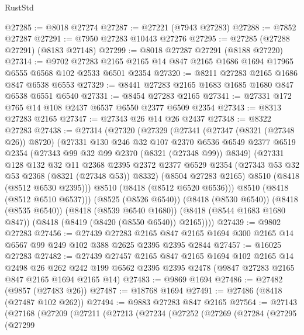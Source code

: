 \begin{lexlean}{RustStd}
\begin{coremodule}
@27285 := @8018 @27274
@27287 := @27221 (@7943 @27283)
@27288 := @7852 @27287
@27291 := @7950 @27283 @10443 @27276
@27295 := @27285 (@27288 @27291) (@8183 @27148)
@27299 := @8018 @27287 @27291 (@8188 @27220)
@27314 := @9702
    @27283
    @2165
    @2165
    @14
    @847
    @2165
    @1686
    @1694
    @17965
    @6555
    @6568
    @102
    @2533
    @6501
    @2354
@27320 := @8211 @27283 @2165 @1686 @847 @6538 @6553
@27329 := @8441 @27283 @2165 @1683 @1685 @1680 @847 @6538 @6551 @6540
@27331 := @8454 @27283 @2165
@27341 := @27331 @172 @765 @14 @108 @2437 @6537 @6550 @2377 @6509 @2354
@27343 := @8313 @27283 @2165
@27347 := @27343 @26 @14 @26 @2437
@27348 := @8322 @27283
@27438 := @27314
    (@27320
      (@27329
        (@27341
          (@27347 (@8321 (@27348 @26)) @8720)
          (@27331
            @130
            @246
            @32
            @107
            @2370
            @6536
            @6549
            @2377
            @6519
            @2354
            (@27343 @99 @32 @99 @2370 (@8321 (@27348 @99)) @8349)
            (@27331
              @128
              @132
              @32
              @11
              @2368
              @2395
              @2372
              @2377
              @6529
              @2354
              (@27343 @53 @32 @53 @2368 (@8321 (@27348 @53)) @8332)
              (@8504 @27283 @2165)
              @8510
              (@8418 (@8512 @6530 @2395)))
            @8510
            (@8418 (@8512 @6520 @6536)))
          @8510
          (@8418 (@8512 @6510 @6537)))
        (@8525 (@8526 @6540))
        (@8418 (@8530 @6540))
        (@8418 (@8535 @6540))
        (@8418 (@8539 @6540 @1680))
        (@8418 (@8544 @1683 @1680 @847))
        (@8418 (@8419 (@8420 (@8550 @6540)) @2165))))
@27439 := @9802 @27283
@27456 := @27439
    @27283
    @2165
    @847
    @2165
    @1694
    @300
    @2165
    @14
    @6567
    @99
    @249
    @102
    @388
    @2625
    @2395
    @2395
    @2844
@27457 := @16025 @27283
@27482 := @27439
    @27457
    @2165
    @847
    @2165
    @1694
    @102
    @2165
    @14
    @2498
    @26
    @262
    @242
    @199
    @6562
    @2395
    @2395
    @2478
    (@9847 @27283 @2165 @847 @2165 @1694 @2165 @14)
@27483 := @9869 @1694
@27486 := @27482 (@9857 (@27483 @26))
@27487 := @18768 @1694
@27491 := @27486 (@8418 (@27487 @102 @262))
@27494 := @9883 @27283 @847 @2165
@27564 := @27143
    (@27168
      (@27209
        (@27211
          (@27213
            (@27234
              (@27252
                (@27269
                  (@27284
                    (@27295
                      (@27299

\end{coremodule}
\end{lexlean}
